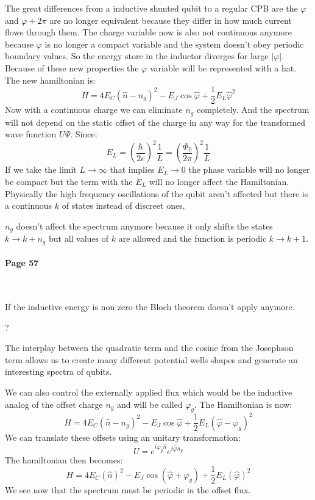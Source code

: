 \documentclass[12pt]{article}
\numberwithin{equation}{subsection}
\newcommand\ask[1]{
{\color{red}
#1
}
}
\newcommand\page[1]{
{
\color{blue}\paragraph{
Page #1
}\mbox{}\\
}
}
\begin{document}
The great differences from a inductive shunted qubit to a regular CPB are the $\varphi$ and $\varphi + 2\pi$ are no longer equivalent because they differ in how much current flows through them. 
The charge variable now is also not continuous anymore because $\varphi$ is no longer a compact variable and the system doesn't obey periodic boundary values. So the energy store in the inductor diverges for large $|\varphi|$. Because of these new properties the $\varphi$ variable will be represented with a hat. The new hamiltonian is:
\begin{equation}
    H = 4E_C(\hat n -n_g)^2 - E_J\cos\hat\varphi + \frac{1}{2} E_L\hat \varphi^2
\end{equation}
Now with a continuous charge we can eliminate $n_g$ completely. And the spectrum will not depend on the static offset of the charge in any way for the transformed wave function $U\Psi$.
Since:
\begin{equation}
    E_L = \left ( \frac{\hbar}{2e}\right)^2\frac{1}{L} =  \left ( \frac{\Phi_0}{2\pi}\right)^2\frac{1}{L}
\end{equation}
If we take the limit $L \rightarrow \infty$ that implies $E_L \rightarrow 0$ the phase variable will no longer be compact but the term with the $E_L$ will no longer affect the Hamiltonian. Physically the high frequency oscillations of the qubit aren't affected but there is a continuous $k$ of states instead of discreet ones.

 $n_g$ doesn't affect the spectrum anymore because it only shifts the states $k \rightarrow k+n_g$ but all values of $k$ are allowed and the function is periodic $k\rightarrow k+1$.

\page{57}

If the inductive energy is non zero the Bloch theorem doesn't apply anymore. 
\ask{?}
The interplay between the quadratic term and the cosine from the Josephson term allows us to create many different potential wells shapes and generate an interesting spectra of qubits.

We can also control the externally applied flux which would be the inductive analog of the offset charge $n_g$ and will be called $\varphi_g$. The Hamiltonian is now:
\begin{equation}
    H = 4E_C(\hat n -n_g)^2 - E_J\cos\hat\varphi + \frac{1}{2} E_L(\hat \varphi - \varphi_g)^2
\end{equation}
We can translate these offsets using an unitary transformation:
\begin{equation}
    U=e^{i\varphi_g\hat n}e^{i\hat \varphi n_g}
\end{equation}
The hamiltonian then becomes:
\begin{equation}
    H = 4E_C(\hat n)^2 - E_J\cos(\hat\varphi+\varphi_g) + \frac{1}{2} E_L(\hat \varphi)^2
\end{equation}
We see now that the spectrum must be periodic in the offset flux.
\end{document}
